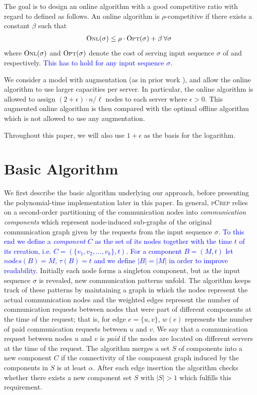 \documentclass[a4paper,UKenglish,cleveref, autoref, thm-restate,authorcolumns]{../lipics/lipics-v2019}
\newcommand{\adjDel}{\textsc{pCrep}}
\newcommand{\opt}{\text{O{\scriptsize PT}}}
\newcommand{\onl}{\text{O{\scriptsize NL}}}
\newcommand{\new}[1]{{\textcolor{blue}{#1}}}
\begin{document}
The goal is to design an online algorithm \onl{} with a good competitive ratio with regard to \opt{} defined as follows.
An online algorithm \onl{} is $\rho$-competitive if there exists a constant $\beta$ such that 
\begin{align*}
\onl{}(\sigma)\leq\rho\cdot \opt{}(\sigma)+\beta\:\forall \sigma
\end{align*} 
where $\onl{}(\sigma)$ and $\opt{}(\sigma)$ denote the cost of serving input sequence $\sigma$ of \onl{} and \opt{} respectively. \new{This has to hold for any input sequence $\sigma$.}

We consider a model with augmentation (as in prior work \cite{Avin2016}),
and allow the online algorithm to use larger capacities per server. 
In particular, the online algorithm is allowed to assign $(2+\epsilon)\cdot n/\ell$ nodes to each server where $\epsilon>0$. 
This augmented online algorithm is then compared with the optimal offline algorithm \opt{} which is not allowed to use any augmentation.

Throughout this paper, 
we will also use $1+\epsilon$ as the basis for the logarithm.

\section{Basic Algorithm}
\label{algIdeas}

We first describe the basic algorithm underlying
our approach, before presenting the polynomial-time implementation
later in this paper.
In general, \adjDel{} relies on a second-order partitioning of the communication nodes into \textit{communication components} which represent node-induced sub-graphs of the original communication graph given by the requests from the input sequence $\sigma$. \new{To this end we define a \textit{component} $C$ as the set of its nodes together with the time $t$ of its creation, i.e. $C=(\{v_1,v_2,...,v_k\}, t)$. For a component $B=(M, t)$ let $nodes(B)=M$, $\tau(B)=t$ and we define $|B|=|M|$ in order to improve readability}.
Initially each node forms a singleton component, but as the input sequence $\sigma$ is revealed, new communication patterns unfold. The algorithm keeps track of these patterns by maintaining a graph in which the nodes represent the actual communication nodes and the weighted edges represent the number of communication requests between nodes that were part of different components at the time of the request; that is, 
for edge $e=\{u,v\}$, $w(e)$ represents the number of paid communication requests between $u$ and $v$. We say that a communication request between nodes $u$ and $v$ is \textit{paid} if the nodes are located on different servers at the time of the request.
The algorithm merges a set $S$ of components into a new component $C$ if the connectivity of the component graph induced by the components in $S$ is at least $\alpha$. After each edge insertion the algorithm checks whether there exists a new component set $S$ with $|S|>1$ which fulfills this requirement.
\end{document}
